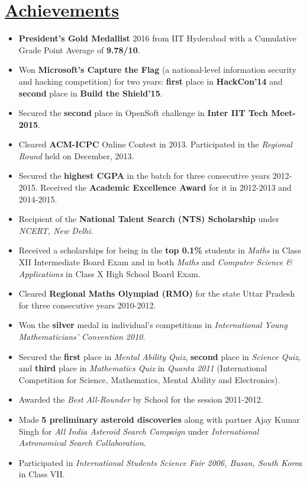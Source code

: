 \documentclass[8pt]{extarticle}
\newcommand{\heading}[1]{
\section*{\color{red}\underline{#1}}
}
\begin{document}
\heading{Achievements}

\begin{itemize}
\item \textbf{President's Gold Medallist} 2016 from IIT Hyderabad with a Cumulative Grade Point Average of \textbf{9.78/10}.

\item Won \textbf{Microsoft's Capture the Flag} (a national-level information security and hacking competition) for two years: \textbf{first} place in \textbf{HackCon'14} and \textbf{second} place in \textbf{Build the Shield'15}.

\item Secured the \textbf{second} place in OpenSoft challenge in \textbf{Inter IIT Tech Meet-2015}.

\item Cleared \textbf{ACM-ICPC} Online Contest in 2013. Participated in the \textit{Regional Round} held on December, 2013.

\item Secured the \textbf{highest CGPA} in the batch for three consecutive years 2012-2015. Received the \textbf{Academic Excellence Award} for it in 2012-2013 and 2014-2015.

\item Recipient of the \textbf{National Talent Search (NTS) Scholarship} under \textit{NCERT, New Delhi}.

\item Received a scholarships for being in the \textbf{top 0.1\%} students in \textit{Maths} in Class XII Intermediate Board Exam and in both \textit{Maths} and \textit{Computer Science \& Applications} in Class X High School Board Exam.

\item Cleared \textbf{Regional Maths Olympiad (RMO)} for the state Uttar Pradesh for three consecutive years 2010-2012.

\item Won the \textbf{silver} medal in individual’s competitions in \textit{International Young Mathematicians’ Convention 2010}.

\item Secured the \textbf{first} place in \textit{Mental Ability Quiz}, \textbf{second} place in \textit{Science Quiz}, and \textbf{third} place in \textit{Mathematics Quiz} in \textit{Quanta 2011} (International Competition for Science, Mathematics, Mental Ability and Electronics).

\item Awarded the \textit{Best All-Rounder} by School for the session 2011-2012.
\item Made \textbf{5 preliminary asteroid discoveries} along with partner Ajay Kumar Singh for \textit{All India Asteroid Search Campaign} under \textit{International Astronomical Search Collaboration}.

\item Participated in \textit{International Students Science Fair 2006, Busan, South Korea} in Class VII.
\end{itemize}
\end{document}
